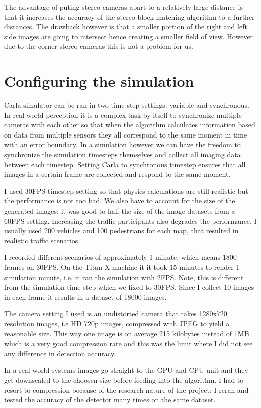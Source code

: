 The advantage of puting stereo cameras apart to a relatively large distance is
that it increases the accuracy of the stereo block matching algorithm to a
further distances. The drawback however is that a smaller portion of the right
and left side images are going to intersect hence creating a smaller field of
view. However due to the corner stereo cameras this is not a problem for us.

\section{Configuring the simulation}

Carla simulator can be ran in two time-step settings: variable and synchronous.
In real-world perception it is a complex task by itself to synchronize multiple
cameras with each other so that when the algorithm calculates information based
on data from multiple sensors they all correspond to the same moment in time
with an error boundary. In a simulation however we can have the freedom to
synchronize the simulation timesteps themselves and collect all imaging data
between each timestep. Setting Carla to synchronous timestep ensures that all
images in a certain frame are collected and respond to the same moment. 

I used 30FPS timestep setting so that physics calculations are still realistic
but the performance is not too bad. We also have to account for the size of the
generated images: it was good to half the size of the image datasets from a
60FPS setting. Increasing the traffic participants also degrades the
performance. I usually used 200 vehicles and 100 pedestrians for each map, that
resulted in realistic traffic scenarios. 

I recorded different scenarios of approximately 1 minute, which means 1800
frames on 30FPS. On the Titan X machine it it took 15 minutes to render 1
simulation minute, i.e. it ran the simulation with 2FPS. Note, this is different
from the simulation time-step which we fixed to 30FPS.  Since I collect 10 images
in each frame it results in a dataset of 18000 images.

The camera setting I used is an undistorted camera that takes 1280x720
resolution images, i.e HD 720p images, compressed with JPEG to yield a
reasonable size. This way one image is on average 215 kilobytes instead of 1MB
which is a very good compression rate and this was the limit where I did not see
any difference in detection accuracy.

In a real-world systems images go straight to the GPU and CPU unit and they get
downscaled to the choosen size before feeding into the algorithm. I had to
resort to compression because of the research nature of the project: I reran
and tested the accuracy of the detector many times on the same dataset.

